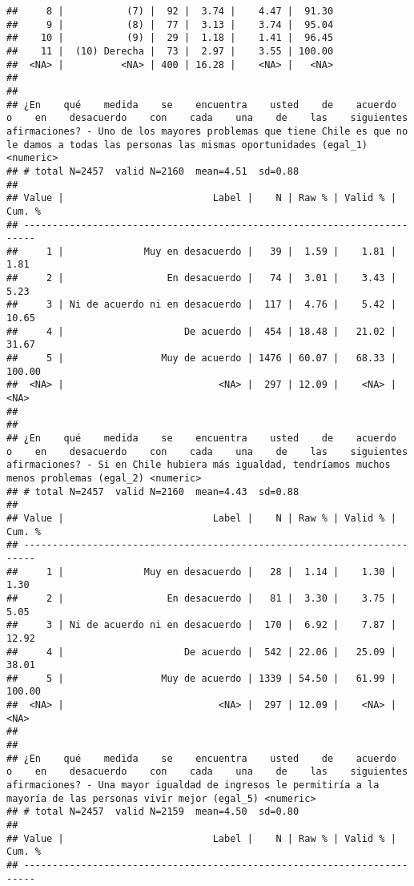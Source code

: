 \documentclass[
  10,
  landscape,
  legalpaper]{article}
\begin{document}
\begin{verbatim}
##     8 |           (7) |  92 |  3.74 |    4.47 |  91.30
##     9 |           (8) |  77 |  3.13 |    3.74 |  95.04
##    10 |           (9) |  29 |  1.18 |    1.41 |  96.45
##    11 |  (10) Derecha |  73 |  2.97 |    3.55 | 100.00
##  <NA> |          <NA> | 400 | 16.28 |    <NA> |   <NA>
## 
## 
## ¿En    qué    medida    se    encuentra    usted    de    acuerdo    o    en    desacuerdo    con    cada    una    de    las    siguientes    afirmaciones? - Uno de los mayores problemas que tiene Chile es que no le damos a todas las personas las mismas oportunidades (egal_1) <numeric>
## # total N=2457  valid N=2160  mean=4.51  sd=0.88
## 
## Value |                          Label |    N | Raw % | Valid % | Cum. %
## ------------------------------------------------------------------------
##     1 |              Muy en desacuerdo |   39 |  1.59 |    1.81 |   1.81
##     2 |                  En desacuerdo |   74 |  3.01 |    3.43 |   5.23
##     3 | Ni de acuerdo ni en desacuerdo |  117 |  4.76 |    5.42 |  10.65
##     4 |                     De acuerdo |  454 | 18.48 |   21.02 |  31.67
##     5 |                 Muy de acuerdo | 1476 | 60.07 |   68.33 | 100.00
##  <NA> |                           <NA> |  297 | 12.09 |    <NA> |   <NA>
## 
## 
## ¿En    qué    medida    se    encuentra    usted    de    acuerdo    o    en    desacuerdo    con    cada    una    de    las    siguientes    afirmaciones? - Si en Chile hubiera más igualdad, tendríamos muchos menos problemas (egal_2) <numeric>
## # total N=2457  valid N=2160  mean=4.43  sd=0.88
## 
## Value |                          Label |    N | Raw % | Valid % | Cum. %
## ------------------------------------------------------------------------
##     1 |              Muy en desacuerdo |   28 |  1.14 |    1.30 |   1.30
##     2 |                  En desacuerdo |   81 |  3.30 |    3.75 |   5.05
##     3 | Ni de acuerdo ni en desacuerdo |  170 |  6.92 |    7.87 |  12.92
##     4 |                     De acuerdo |  542 | 22.06 |   25.09 |  38.01
##     5 |                 Muy de acuerdo | 1339 | 54.50 |   61.99 | 100.00
##  <NA> |                           <NA> |  297 | 12.09 |    <NA> |   <NA>
## 
## 
## ¿En    qué    medida    se    encuentra    usted    de    acuerdo    o    en    desacuerdo    con    cada    una    de    las    siguientes    afirmaciones? - Una mayor igualdad de ingresos le permitiría a la mayoría de las personas vivir mejor (egal_5) <numeric>
## # total N=2457  valid N=2159  mean=4.50  sd=0.80
## 
## Value |                          Label |    N | Raw % | Valid % | Cum. %
## ------------------------------------------------------------------------

\end{verbatim}
\end{document}
